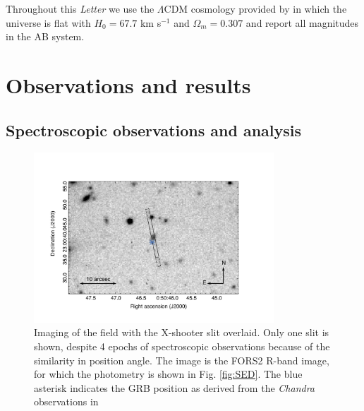 \documentclass{aa}    %
\begin{document}
Throughout this \emph{Letter} we use the $\Lambda$CDM cosmology provided by
\citet{Planck2015} in which the universe is flat with $H_0 = 67.7$ km s$^{-1}$ and
$\Omega_m = 0.307$ and report all magnitudes in the AB system.


\section{Observations and results}

\subsection{Spectroscopic observations and analysis}

\begin{figure}
	\centering
	\includegraphics[width=9cm]{figures/GRB111117A_spec_obs.pdf}
	\caption{Imaging of the field with the X-shooter slit overlaid. Only one slit is shown, despite 4 epochs of spectroscopic observations because of the similarity in position angle. The image is the FORS2 R-band image, for which the photometry is shown in Fig. \ref{fig:SED}. The blue asterisk indicates the GRB position as derived from the \emph{Chandra} observations in \citet{Sakamoto2013}}
	\label{fig:spec_setup}
\end{figure}
\end{document}

